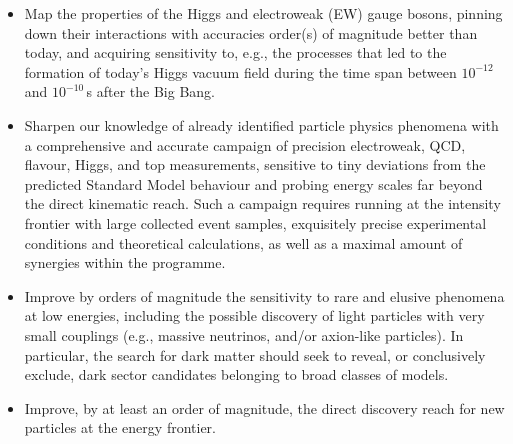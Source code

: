 \begin{itemize}
    \item Map the properties of the Higgs and electroweak (EW) gauge bosons, pinning down their interactions with accuracies order(s) of magnitude better than today, and acquiring
    sensitivity to, e.g., the processes that led to the formation of today's Higgs vacuum field during the time span between $10^{-12}$ and $10^{-10}$\,s after the Big Bang.
    \item Sharpen our knowledge of already identified particle physics phenomena 
    with a comprehensive and accurate campaign of precision electroweak, QCD, flavour, Higgs, and top measurements, sensitive to tiny deviations from the predicted Standard Model behaviour and probing energy scales far beyond the direct kinematic reach. 
    Such a campaign requires running at the intensity frontier with large collected event samples, exquisitely precise experimental conditions and theoretical calculations, as well as a maximal amount of synergies within the programme. 
    \item Improve by orders of magnitude the sensitivity to rare and elusive phenomena at low energies, including the possible discovery of light particles with very small couplings (e.g., massive neutrinos, and/or axion-like particles). 
    In particular, the search for dark matter should seek to reveal, or conclusively exclude, dark sector  candidates belonging to broad classes of models.
    \item Improve, by at least an order of magnitude, the direct discovery reach for new particles at the energy frontier.
\end{itemize}

